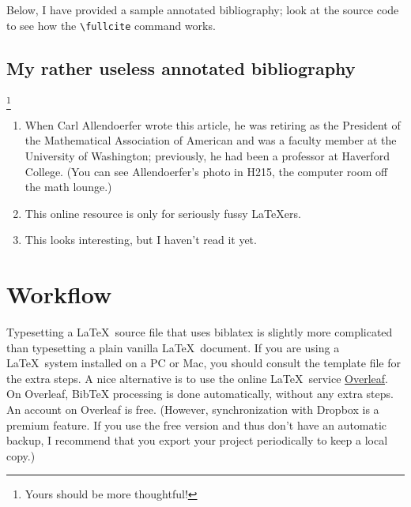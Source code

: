 \documentclass[11pt]{amsart}
\begin{document}
Below, I have provided a sample annotated bibliography; look at the source code to see how the \verb+\fullcite+ command works.

\subsection{My rather useless annotated bibliography}\footnote{Yours should be more thoughtful!}

\begin{enumerate}
\item {}

\smallskip
When Carl Allendoerfer wrote this article, he was retiring as the President of the Mathematical Association of American and was a faculty member at the University of Washington; previously, he had been a professor at Haverford College. (You can see Allendoerfer's photo in H215, the computer room off the math lounge.)

\item {}

\smallskip
This online resource is only for seriously fussy \LaTeX ers.

\item {}

\smallskip
This looks interesting, but I haven't read it yet.
\end{enumerate}




\section{Workflow}\label{workflow}

Typesetting a \LaTeX\ source file that uses biblatex is slightly more complicated than typesetting a plain vanilla \LaTeX\ document. If you are using a \LaTeX\ system installed on a PC or Mac, you should consult the template file for the extra steps. 
A nice alternative is to use the online \LaTeX\ service \href{https://www.overleaf.com/}{Overleaf}. 
On Overleaf, BibTeX processing is done automatically, without any extra steps. 
An account on Overleaf is free. (However, synchronization with Dropbox is a premium feature. If you use the free version and thus don't have an automatic backup, I recommend that you export your project periodically to keep a local copy.)
\end{document}
